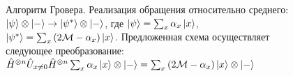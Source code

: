 \begin{figure}
\centering



\caption{Алгоритм Гровера. Реализация обращения относительно
  среднего: $\left|\psi\right>\otimes\ket{-} \rightarrow
  \left|\psi^{\ast}\right>\otimes\ket{-}$, где
$\left|\psi\right> = \sum_x \alpha_x \ket{ x }$, 
$\left|\psi^{\ast}\right> = \sum_x \left( 2 \mathcal{M} -  \alpha_x \right)
  \ket{ x }$. 
Предложенная схема осуществляет следующее преобразование: 
$\hat{H}^{\otimes n}\hat{U}_{x \ne 0}\hat{H}^{\otimes n} \sum_x
  \alpha_x \ket{ x } \otimes \left| - \right > = 
\sum_x \left( 2 \mathcal{M} -  \alpha_x \right) \ket{ x }
\otimes \left| - \right >
$
} 
\label{figQuantCompGroverMeanInvImpl}
\end{figure}
